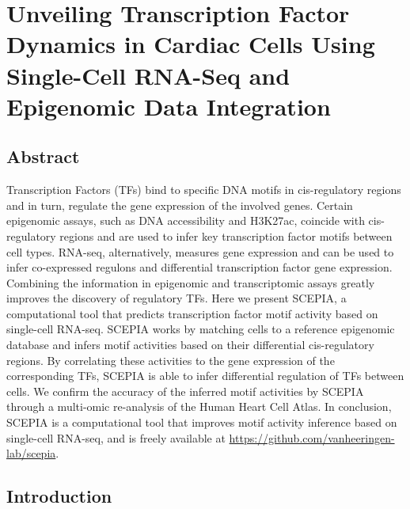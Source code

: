 \chapter{Unveiling Transcription Factor Dynamics in Cardiac Cells Using Single-Cell RNA-Seq and Epigenomic Data Integration}\thumbforchapter

\newpage

\section{Abstract}

Transcription Factors (TFs) bind to specific DNA motifs in cis-regulatory regions and in turn, regulate the gene expression of the involved genes. Certain epigenomic assays, such as DNA accessibility and H3K27ac, coincide with cis-regulatory regions and are used to infer key transcription factor motifs between cell types. RNA-seq, alternatively, measures gene expression and can be used to infer co-expressed regulons and differential transcription factor gene expression. Combining the information in epigenomic and transcriptomic assays greatly improves the discovery of regulatory TFs. Here we present SCEPIA, a computational tool that predicts transcription factor motif activity based on single-cell RNA-seq. SCEPIA works by matching cells to a reference epigenomic database and infers motif activities based on their differential cis-regulatory regions. By correlating these activities to the gene expression of the corresponding TFs, SCEPIA is able to infer differential regulation of TFs between cells. We confirm the accuracy of the inferred motif activities by SCEPIA through a multi-omic re-analysis of the Human Heart Cell Atlas. In conclusion, SCEPIA is a computational tool that improves motif activity inference based on single-cell RNA-seq, and is freely available at \url{https://github.com/vanheeringen-lab/scepia}.

\section{Introduction}


